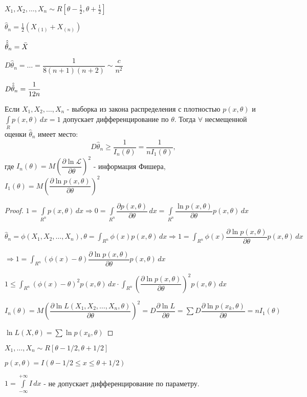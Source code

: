 \begin{ex}
  $X_1, X_2, \dots, X_n \sim R[\theta-\frac{1}{2}, \theta+\frac{1}{2}]$

  $\hat\theta_n = \frac{1}{2} (X_{(1)} + X_{(n)})$
  
  $\Hat{\Hat{\theta}}_n = \bar X$

  $D\hat\theta_n = \dots = \dfrac{1}{8 (n+1) (n+2)} \sim \dfrac{c}{n^2}$

  $D\Hat{\Hat{\theta}}_n = \dfrac{1}{12n}$
\end{ex}

\begin{theorem}
  Если $X_1, X_2, \dots, X_n$ - выборка из закона распределения с плотностью $p(x, \theta)$ и $\int\limits_R p(x, \theta) \, dx = 1$ допускает дифференцирование по $\theta$.
  Тогда $\forall$ несмещенной оценки $\hat\theta_n$ имеет место:
  $$D\hat\theta_n \geqslant \frac{1}{I_n(\theta)} = \frac{1}{n I_1(\theta)},$$
  где $I_n(\theta) = M\left( \dfrac{\partial \ln \mathcal{L}}{\partial \theta} \right)^2$ - информация Фишера,
    $I_1(\theta) = M\left( \dfrac{\partial\ln p(x, \theta)}{\partial\theta} \right)^2$
\end{theorem}

\begin{proof}
  $1 = \int\limits_{R^n} p(x, \theta) \, dx \Rightarrow 0 = \int\limits_{R^n} \dfrac{\partial p(x, \theta)}{\partial\theta} \, dx = \int\limits_{R^n} \dfrac{\ln p(x, \theta)}{\partial\theta} p(x, \theta) \, dx$

  $\hat\theta_n = \phi(X_1, X_2, \dots, X_n), \theta = \int_{R^n} \phi(x) p(x, \theta) \, dx \Rightarrow 1 = \int_{R^n} \phi(x) \dfrac{\partial \ln p(x, \theta)}{\partial\theta} p(x, \theta) \, dx$

  $\Rightarrow 1 = \int_{R^n} (\phi(x)-\theta) \dfrac{\partial \ln p(x, \theta)}{\partial \theta} p(x, \theta) \, dx$

  $1 \leqslant \int_{R^n} (\phi(x) - \theta)^2 p(x, \theta) \, dx \cdot \int_{R^n} (\dfrac{\partial\ln p(x, \theta)}{\partial\theta})^2 p(x, \theta) \, dx$

  $I_n(\theta) = M \left(\dfrac{\partial\ln L(X_1, X_2, \dots, X_n, \theta)}{\partial\theta}\right)^2 = D \dfrac{\partial \ln L}{\partial\theta} = \sum D\dfrac{\partial \ln p(x_k, \theta)}{\partial\theta} = n I_1(\theta)$

  $\ln L(X, \theta) = \sum \ln p(x_k, \theta)$
\end{proof}

\begin{ex}
  $X_1, \dots, X_n \sim R[\theta-1/2, \theta+1/2]$

  $p(x, \theta) = I(\theta-1/2 \leqslant x \leqslant \theta+1/2)$

  $1 = \int\limits_{-\infty}^{+\infty} I \, dx$ - не допускает дифференцирование по параметру.
\end{ex}

